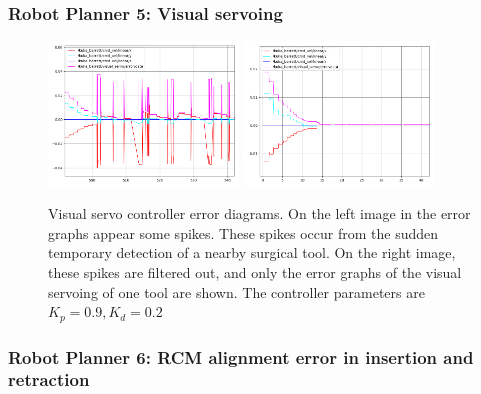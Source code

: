 \begin{frame}
\frametitle{Robot Planner 5: Visual servoing}
\begin{center}
\begin{figure}[!htb]
\centering
\includegraphics[width=0.45\textwidth]{../images/robot_planner5/visual_servo_controller3.png}
\includegraphics[width=0.45\textwidth]{../images/robot_planner5/visual_servo_controller4.png}\\
\caption{Visual servo controller error diagrams. On the left image in the error graphs appear some spikes. These spikes occur from the sudden temporary detection 
of a nearby surgical tool. On the right image, these spikes are filtered out, and only the error graphs of the visual servoing of one tool are shown. The  
controller parameters are $K_p = 0.9, K_d = 0.2$}
\end{figure}
\end{center}
\end{frame}

\begin{frame}
\frametitle{Robot Planner 6: RCM alignment error in insertion and retraction}
\end{frame}

